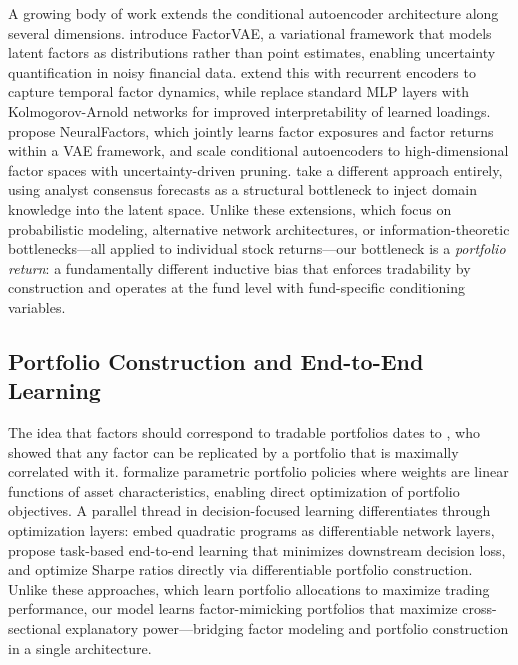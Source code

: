 A growing body of work extends the conditional autoencoder architecture along several dimensions. \citet{Duan2022factorvae} introduce FactorVAE, a variational framework that models latent factors as distributions rather than point estimates, enabling uncertainty quantification in noisy financial data. \citet{WangGuo2024rvrae} extend this with recurrent encoders to capture temporal factor dynamics, while \citet{WangSingh2024kan} replace standard MLP layers with Kolmogorov-Arnold networks for improved interpretability of learned loadings. \citet{Gopal2024neuralfactors} propose NeuralFactors, which jointly learns factor exposures and factor returns within a VAE framework, and \citet{Engel2025scaling} scale conditional autoencoders to high-dimensional factor spaces with uncertainty-driven pruning. \citet{Jang2025consensus} take a different approach entirely, using analyst consensus forecasts as a structural bottleneck to inject domain knowledge into the latent space. Unlike these extensions, which focus on probabilistic modeling, alternative network architectures, or information-theoretic bottlenecks---all applied to individual stock returns---our bottleneck is a \emph{portfolio return}: a fundamentally different inductive bias that enforces tradability by construction and operates at the fund level with fund-specific conditioning variables.

\subsection{Portfolio Construction and End-to-End Learning}

The idea that factors should correspond to tradable portfolios dates to \citet{Huberman1987mimicking}, who showed that any factor can be replicated by a portfolio that is maximally correlated with it. \citet{Brandt2009parametric} formalize parametric portfolio policies where weights are linear functions of asset characteristics, enabling direct optimization of portfolio objectives. A parallel thread in decision-focused learning differentiates through optimization layers: \citet{Amos2017optnet} embed quadratic programs as differentiable network layers, \citet{Donti2017taskbased} propose task-based end-to-end learning that minimizes downstream decision loss, and \citet{Zhang2020portfolio} optimize Sharpe ratios directly via differentiable portfolio construction. Unlike these approaches, which learn portfolio allocations to maximize trading performance, our model learns factor-mimicking portfolios that maximize cross-sectional explanatory power---bridging factor modeling and portfolio construction in a single architecture.

